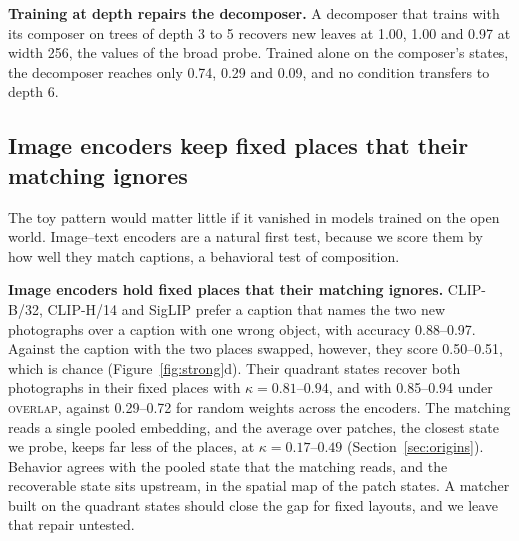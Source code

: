 \documentclass[10pt]{article}
\theoremstyle{plain}
\theoremstyle{remark}
\begin{document}
\textbf{Training at depth repairs the decomposer.} A decomposer that trains with its composer on trees of depth 3 to 5 recovers new leaves at 1.00, 1.00 and 0.97 at width 256, the values of the broad probe. Trained alone on the composer's states, the decomposer reaches only 0.74, 0.29 and 0.09, and no condition transfers to depth 6.

\subsection{Image encoders keep fixed places that their matching ignores}
\label{sec:images}

The toy pattern would matter little if it vanished in models trained on the open world. Image--text encoders are a natural first test, because we score them by how well they match captions, a behavioral test of composition.

\textbf{Image encoders hold fixed places that their matching ignores.} CLIP-B/32, CLIP-H/14 and SigLIP prefer a caption that names the two new photographs over a caption with one wrong object, with accuracy 0.88--0.97. Against the caption with the two places swapped, however, they score 0.50--0.51, which is chance (Figure~\ref{fig:strong}d). Their quadrant states recover both photographs in their fixed places with $\kappa = 0.81$--$0.94$, and with 0.85--0.94 under \textsc{overlap}, against 0.29--0.72 for random weights across the encoders. The matching reads a single pooled embedding, and the average over patches, the closest state we probe, keeps far less of the places, at $\kappa = 0.17$--$0.49$ (Section~\ref{sec:origins}). Behavior agrees with the pooled state that the matching reads, and the recoverable state sits upstream, in the spatial map of the patch states. A matcher built on the quadrant states should close the gap for fixed layouts, and we leave that repair untested.
\end{document}
